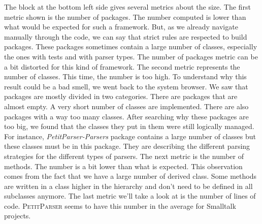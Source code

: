 The block at the bottom left side gives several metrics about the size. The first metric shown is the number of packages. The number computed is lower than what would be expected for such a framework. But, as we already navigate manually through the code, we can say that strict rules are respected to build packages. These packages sometimes contain a large number of classes, especially the ones with tests and with parser types. The number of packages metric can be a bit distorted for this kind of framework. The second metric represents the number of classes. This time, the number is too high. To understand why this result could be a bad smell, we went back to the system browser. We saw that packages are mostly divided in two categories. There are packages that are almost empty. A very short number of classes are implemented. There are also packages with a way too many classes. After searching why these packages are too big, we found that the classes they put in them were still logically managed.  For instance, \textit{PetitParser-Parsers} package contains a large number of classes but these classes must be in this package. They are describing the different parsing strategies for the different types of parsers. The next metric is the number of methods. The number is a bit lower than what is expected. This observation comes from the fact that we have a large number of derived class. Some methods are written in a class higher in the hierarchy and don't need to be defined in all subclasses anymore. The last metric we'll take a look at is the number of lines of code. \textsc{PetitParser} seems to have this number in the average for Smalltalk projects.

